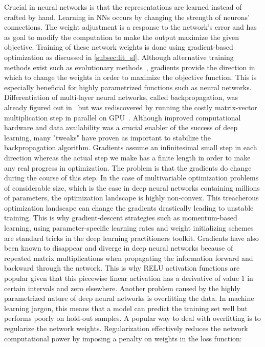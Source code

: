 \documentclass[\home/main.tex]{subfiles}
\begin{document}
Crucial in neural networks is that the representations are learned instead of crafted by hand. Learning in \glspl{NN} occurs by changing the strength of neurons' connections. The weight adjustment is a response to the network's error and has as goal to modify the computation to make the output maximize the given objective. Training of these network weights is done using gradient-based optimization as discussed in \cref{subsec:lit_sl}. Although alternative training methods exist such as evolutionary methods~\autocite{salimans2017evolution}, gradients provide the direction in which to change the weights in order to maximize the objective function. This is especially beneficial for highly parametrized functions such as neural networks. Differentiation of multi-layer neural networks, called backpropagation, was already figured out in~\autocite{rumelhart1986learning} but was rediscovered by running the costly matrix-vector multiplication step in parallel on GPU~\autocite{gpu-nn}. Although improved computational hardware and data availability was a crucial enabler of the success of deep learning, many "tweaks" have proven as important to stabilize the backpropagation algorithm. Gradients assume an infinitesimal small step in each direction whereas the actual step we make has a finite length in order to make any real progress in optimization. The problem is that the gradients do change during the course of this step. In the case of multivariable optimization problems of considerable size, which is the case in deep neural networks containing millions of parameters, the optimization landscape is highly non-convex. This treacherous optimization landscape can change the gradients drastically leading to unstable training. This is why gradient-descent strategies such as momentum-based learning, using parameter-specific learning rates and weight initializing schemes are standard tricks in the deep learning practitioners toolkit. Gradients have also been known to disappear and diverge in deep neural networks because of repeated matrix multiplications when propagating the information forward and backward through the network. This is why \gls{RELU} activation functions are popular given that this piecewise linear activation has a derivative of value $1$ in certain intervals and zero elsewhere. Another problem caused by the highly parametrized nature of deep neural networks is overfitting the data. In machine learning jargon, this means that a model can predict the training set well but performs poorly on hold-out samples. A popular way to deal with overfitting is to regularize the network weights. Regularization effectively reduces the network computational power by imposing a penalty on weights in the loss function:
\end{document}
